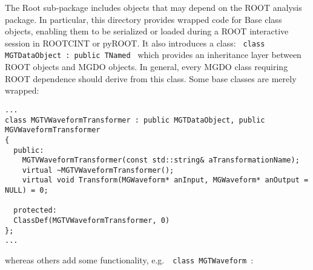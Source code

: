 	The Root sub-package includes objects that may depend on the ROOT analysis package.  In particular, this directory provides
wrapped code for Base class objects, enabling them to be serialized or loaded during a ROOT interactive session in ROOTCINT or pyROOT.  It also introduces a class: \lstinline! class MGTDataObject : public TNamed ! which provides an inheritance layer between ROOT objects and MGDO objects.  In general, every MGDO class requiring ROOT dependence should derive from this class.  Some base classes are merely wrapped:
			\begin{lstlisting}[label=lst:RootWrappedExamp]
...
class MGTVWaveformTransformer : public MGTDataObject, public MGVWaveformTransformer 
{
  public:
    MGTVWaveformTransformer(const std::string& aTransformationName);
    virtual ~MGTVWaveformTransformer();    
    virtual void Transform(MGWaveform* anInput, MGWaveform* anOutput = NULL) = 0;
    
  protected:
  ClassDef(MGTVWaveformTransformer, 0) 
};
...			\end{lstlisting}		
whereas others add some functionality, e.g.~\lstinline! class MGTWaveform !:
